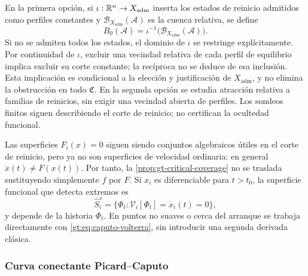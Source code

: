 En la primera opción, si $\iota:\mathbb{R}^n\to X_{\mathrm{adm}}$ inserta los estados de
reinicio admitidos como perfiles constantes y
$\mathcal B_{X_{\mathrm{adm}}}(\mathcal A)$ es la cuenca relativa, se define
\begin{equation}
 B_0(\mathcal A)=\iota^{-1}
 \bigl(\mathcal B_{X_{\mathrm{adm}}}(\mathcal A)\bigr).
 \label{gt:eq:reset-basin}
\end{equation}
Si no se admiten todos los estados, el dominio de $\iota$ se restringe
explícitamente. Por continuidad de $\iota$, excluir una vecindad relativa de
cada perfil de equilibrio implica excluir su corte constante; la recíproca
no se deduce de esa inclusión. Esta implicación es condicional a la elección
y justificación de $X_{\mathrm{adm}}$, y no elimina la obstrucción en todo
$\mathfrak C$. En la segunda opción se estudia atracción relativa a familias
de reinicios, sin exigir una vecindad abierta de perfiles. Los sondeos finitos
siguen describiendo el corte de reinicio; no certifican la ocultedad funcional.

Las superficies $F_i(x)=0$ siguen siendo conjuntos algebraicos útiles en el
corte de reinicio, pero ya no son superficies de velocidad ordinaria: en
general $\dot x(t)\ne F(x(t))$. Por tanto, la
\cref{prop:gt-critical-coverage} no se traslada sustituyendo simplemente
$f$ por $F$. Si $x_i$ es diferenciable para $t>t_0$, la superficie funcional
que detecta extremos es
\begin{equation}
 \widehat S_i^v
 =\{\Phi_t:\mathcal V_i[\Phi_t]=\dot x_i(t)=0\},
 \label{gt:eq:functional-critical-surface}
\end{equation}
y depende de la historia $\Phi_t$. En puntos no suaves o cerca del arranque se
trabaja directamente con \eqref{gt:eq:caputo-volterra}, sin introducir una
segunda derivada clásica.

\subsubsection{Curva conectante Picard--Caputo}

